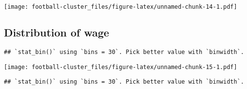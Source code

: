 \documentclass[]{article}
\newenvironment{Shaded}{\begin{snugshade}}{\end{snugshade}}
\newcommand{\DataTypeTok}[1]{\textcolor[rgb]{0.13,0.29,0.53}{#1}}
\newcommand{\DecValTok}[1]{\textcolor[rgb]{0.00,0.00,0.81}{#1}}
\newcommand{\FloatTok}[1]{\textcolor[rgb]{0.00,0.00,0.81}{#1}}
\newcommand{\KeywordTok}[1]{\textcolor[rgb]{0.13,0.29,0.53}{\textbf{#1}}}
\newcommand{\NormalTok}[1]{#1}
\newcommand{\OperatorTok}[1]{\textcolor[rgb]{0.81,0.36,0.00}{\textbf{#1}}}
\newcommand{\StringTok}[1]{\textcolor[rgb]{0.31,0.60,0.02}{#1}}
\begin{document}
\texttt{[image: football-cluster\_files/figure-latex/unnamed-chunk-14-1.pdf]}

\hypertarget{distribution-of-wage}{%
\subsection{Distribution of wage}\label{distribution-of-wage}}

\begin{Shaded}
\end{Shaded}

\begin{verbatim}
## `stat_bin()` using `bins = 30`. Pick better value with `binwidth`.
\end{verbatim}

\texttt{[image: football-cluster\_files/figure-latex/unnamed-chunk-15-1.pdf]}

\begin{Shaded}
\end{Shaded}

\begin{verbatim}
## `stat_bin()` using `bins = 30`. Pick better value with `binwidth`.
\end{verbatim}
\end{document}
